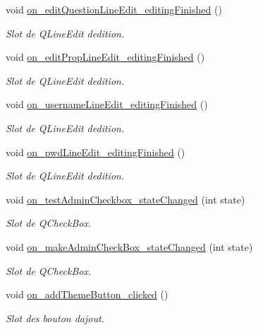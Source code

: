 \begin{DoxyCompactItemize}
void \mbox{\hyperlink{classManageWindow_a9073026764e994ee447cc68fc4c97521}{on\+\_\+edit\+Question\+Line\+Edit\+\_\+editing\+Finished}} ()
\begin{DoxyCompactList}\small\item\em Slot de Q\+Line\+Edit d\textquotesingle{}edition. \end{DoxyCompactList}\item 
void \mbox{\hyperlink{classManageWindow_aa6223c4f4deb479dd97dc386e6425a6a}{on\+\_\+edit\+Prop\+Line\+Edit\+\_\+editing\+Finished}} ()
\begin{DoxyCompactList}\small\item\em Slot de Q\+Line\+Edit d\textquotesingle{}edition. \end{DoxyCompactList}\item 
void \mbox{\hyperlink{classManageWindow_ac8f74ba7697067a0aaadabd04675093e}{on\+\_\+username\+Line\+Edit\+\_\+editing\+Finished}} ()
\begin{DoxyCompactList}\small\item\em Slot de Q\+Line\+Edit d\textquotesingle{}edition. \end{DoxyCompactList}\item 
void \mbox{\hyperlink{classManageWindow_ab8ca1c057dcd2d277a3540a66cd9145c}{on\+\_\+pwd\+Line\+Edit\+\_\+editing\+Finished}} ()
\begin{DoxyCompactList}\small\item\em Slot de Q\+Line\+Edit d\textquotesingle{}edition. \end{DoxyCompactList}\item 
void \mbox{\hyperlink{classManageWindow_ab2651b6595618b6c1c1789328d47cd35}{on\+\_\+test\+Admin\+Checkbox\+\_\+state\+Changed}} (int state)
\begin{DoxyCompactList}\small\item\em Slot de Q\+Check\+Box. \end{DoxyCompactList}\item 
void \mbox{\hyperlink{classManageWindow_ab7d59fdc4c2c9a5e87a35bbd2dc347eb}{on\+\_\+make\+Admin\+Check\+Box\+\_\+state\+Changed}} (int state)
\begin{DoxyCompactList}\small\item\em Slot de Q\+Check\+Box. \end{DoxyCompactList}\item 
void \mbox{\hyperlink{classManageWindow_a77d7f3c9d65fa3e1842778aa554c3d19}{on\+\_\+add\+Theme\+Button\+\_\+clicked}} ()
\begin{DoxyCompactList}\small\item\em Slot des bouton d\textquotesingle{}ajout. \end{DoxyCompactList}\item 

\end{DoxyCompactItemize}
